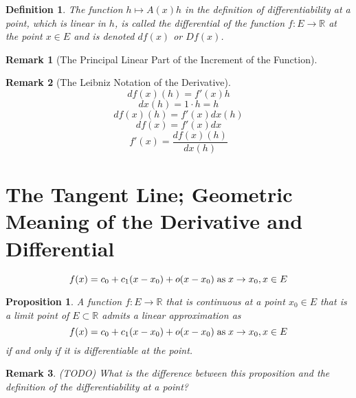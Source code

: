 \documentclass[onecolumn]{ctexart}
\newtheorem{definition}{Definition}
\newtheorem{proposition}{Proposition}
\newtheorem{remark}{Remark}
\begin{document}
\begin{definition}
  The function $h \mapsto A(x)h$ in the definition of differentiability at a 
  point, which is linear in $h$, is called the differential of the function $f:E 
  \to \mathbb{R}$ at the point $x \in E$ and is denoted $df(x)$ or $Df(x)$.
\end{definition}
\begin{remark}[The Principal Linear Part of the Increment of the Function]
  
\end{remark}
\begin{remark}[The Leibniz Notation of the Derivative]
  \begin{equation}
    df(x)(h) = f'(x)h
  \end{equation}
  \[
    dx(h) = 1 \cdot h = h
  \]
  \begin{equation}
    df(x)(h) = f'(x)dx(h)
  \end{equation}
  \begin{equation}
    df(x) = f'(x)dx
  \end{equation}
  \begin{equation}
    f'(x) = \frac{df(x)(h)}{dx(h)}
  \end{equation}
\end{remark}

\section{The Tangent Line; Geometric Meaning of the Derivative and Differential}

\begin{equation}
  f(x) = c_0 + c_1(x - x_0) + o(x - x_0) \thickspace \textnormal{as} \thickspace x \to x_0, x \in E
\end{equation}

\begin{proposition}
  A function $f:E \to \mathbb{R}$ that is continuous at a point $x_0 \in E$ that 
  is a limit point of $E \subset \mathbb{R}$ admits a linear approximation as 
  \begin{equation}
    f(x) = c_0 + c_1(x - x_0) + o(x - x_0) \thickspace \textnormal{as} \thickspace x \to x_0, x \in E
  \end{equation} 
  if and only if it is differentiable at the point.
\end{proposition}
\begin{remark}
  (TODO) What is the difference between this proposition and the definition of the 
  differentiability at a point?
\end{remark}
\end{document}

